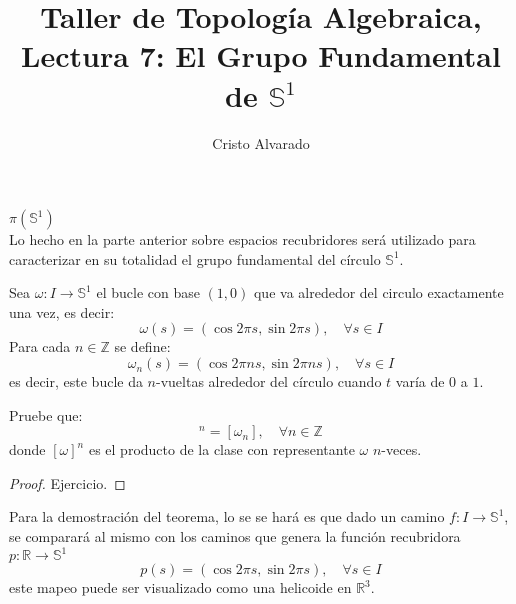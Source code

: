 \documentclass{article}
\newcounter{it}
\theoremstyle{largebreak}
\newcommand\subtitle[1]{\textit{\large #1}\\}
\newcommand\cf[3]{\ensuremath{#1:#2\rightarrow#3}}
\begin{document}
    \title{Taller de Topología Algebraica, Lectura 7: El Grupo Fundamental de $\mathbb{S}^1$}
    \author{Cristo Alvarado}
    \setcounter{section}{7}
    \maketitle

    \subtitle{$\pi(\mathbb{S}^1)$}

    Lo hecho en la parte anterior sobre espacios recubridores será utilizado para caracterizar en su totalidad el grupo fundamental del círculo $\mathbb{S}^1$.

    \begin{mydef}
        Sea $\cf{\omega}{I}{\mathbb{S}^1}$ el bucle con base $(1,0)$ que va alrededor del circulo exactamente una vez, es decir:
        \begin{equation*}
            \omega(s)=(\cos 2\pi s,\sin 2\pi s),\quad\forall s\in I
        \end{equation*}
        Para cada $n\in\mathbb{Z}$ se define:
        \begin{equation*}
            \omega_n(s)=(\cos 2\pi ns,\sin 2\pi ns),\quad\forall s\in I
        \end{equation*}
        es decir, este bucle da $n$-vueltas alrededor del círculo cuando $t$ varía de $0$ a $1$.
    \end{mydef}

    \begin{excer}
        Pruebe que:
        \begin{equation*}
            [\omega]^n=[\omega_n],\quad\forall n\in\mathbb{Z}
        \end{equation*}
        donde $[\omega]^n$ es el producto de la clase con representante $\omega$ $n$-veces.
    \end{excer}

    \begin{proof}
        Ejercicio.
    \end{proof}

    Para la demostración del teorema, lo se se hará es que dado un camino $\cf{f}{I}{\mathbb{S}^1}$, se comparará al mismo con los caminos que genera la función recubridora $\cf{p}{\mathbb{R}}{\mathbb{S}^1}$
    \begin{equation*}
        p(s)=(\cos 2\pi s,\sin 2\pi s),\quad\forall s\in I
    \end{equation*}
    este mapeo puede ser visualizado como una helicoide en $\mathbb{R}^3$.
\end{document}
